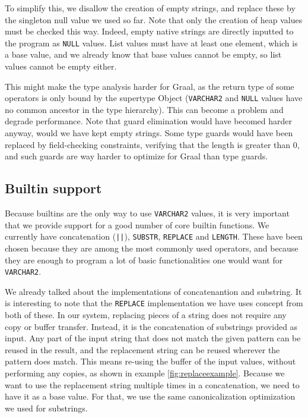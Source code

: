 \documentclass[twoside,11pt,a4paper]{article}
\newcommand{\java}[1]{\textsf{#1}}
\newcommand{\pls}[1]{\small\texttt{#1}\normalsize}
\newcommand{\plstype}[1]{\pls{#1}}
\newcommand{\varchar}{\plstype{VARCHAR2}}
\newcommand{\plsnull}{\pls{NULL}}
\begin{document}
To simplify this, we disallow the creation of empty strings, and replace these by the singleton null value we used so far. Note that only the creation of heap values must be checked this way. Indeed, empty native strings are directly inputted to the program as \plsnull{} values. List values must have at least one element, which is a base value, and we already know that base values cannot be empty, so list values cannot be empty either.

This might make the type analysis harder for Graal, as the return type of some operators is only bound by the supertype \java{Object} (\varchar{} and \plsnull{} values have no common ancestor in the type hierarchy). This can become a problem and degrade performance. Note that guard elimination would have becomed harder anyway, would we have kept empty strings. Some type guards would have been replaced by field-checking constraints, verifying that the length is greater than 0, and such guards are way harder to optimize for Graal than type guards.

\subsection{Builtin support}


Because builtins are the only way to use \varchar{} values, it is very important that we provide support for a good number of core builtin functions. We currently have concatenation (\pls{||}), \pls{SUBSTR}, \pls{REPLACE} and \pls{LENGTH}. These have been chosen because they are among the most commonly used operators, and because they are enough to program a lot of basic functionalities one would want for \varchar{}.

We already talked about the implementations of concatenantion and substring. It is interesting to note that the \pls{REPLACE} implementation we have uses concept from both of these. In our system, replacing pieces of a string does not require any copy or buffer transfer. Instead, it is the concatenation of substrings provided as input. Any part of the input string that does not match the given pattern can be reused in the result, and the replacement string can be reused wherever the pattern does match. This means re-using the buffer of the input values, without performing any copies, as shown in example \ref{fig:replaceexample}. Because we want to use the replacement string multiple times in a concatenation, we need to have it as a base value. For that, we use the same canonicalization optimization we used for substrings.
\end{document}
